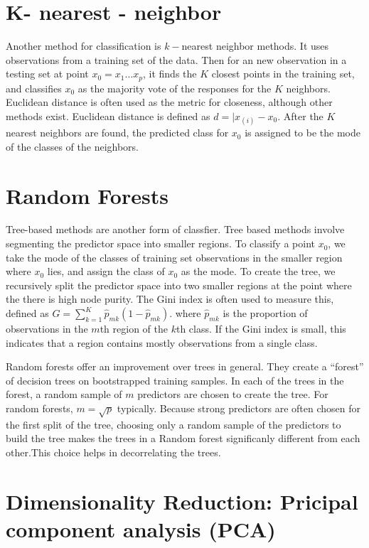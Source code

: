 \documentclass[12pt,twoside]{reedthesis}
\theoremstyle{definition}
\theoremstyle{definition}
\theoremstyle{definition}
\theoremstyle{remark}
\begin{document}
\section{K- nearest - neighbor}\label{k--nearest---neighbor}

Another method for classification is \(k-\)nearest neighbor methods. It
uses observations from a training set of the data. Then for an new
observation in a testing set at point \(x_0 = x_1 \ldots x_p\), it finds
the \(K\) closest points in the training set, and classifies \(x_0\) as
the majority vote of the responses for the \(K\) neighbors. Euclidean
distance is often used as the metric for closeness, although other
methods exist. Euclidean distance is defined as \(d = |x_{(i)} - x_0\).
After the \(K\) nearest neighbors are found, the predicted class for
\(x_0\) is assigned to be the mode of the classes of the neighbors.

\section{Random Forests}\label{random-forests}

Tree-based methods are another form of classfier. Tree based methods
involve segmenting the predictor space into smaller regions. To classify
a point \(x_0\), we take the mode of the classes of training set
observations in the smaller region where \(x_0\) lies, and assign the
class of \(x_0\) as the mode. To create the tree, we recursively split
the predictor space into two smaller regions at the point where the
there is high node purity. The Gini index is often used to measure this,
defined as \(G = \sum_{k = 1}^K \hat{p}_{mk}(1 - \hat{p}_{mk})\). where
\(\hat{p}_{mk}\) is the proportion of observations in the \(m\)th region
of the \(k\)th class. If the Gini index is small, this indicates that a
region contains mostly observations from a single class.

Random forests offer an improvement over trees in general. They create a
``forest'' of decision trees on bootstrapped training samples. In each
of the trees in the forest, a random sample of \(m\) predictors are
chosen to create the tree. For random forests, \(m = \sqrt{p}\)
typically. Because strong predictors are often chosen for the first
split of the tree, choosing only a random sample of the predictors to
build the tree makes the trees in a Random forest significanly different
from each other.This choice helps in decorrelating the trees.

\section{Dimensionality Reduction: Pricipal component analysis
(PCA)}\label{dimensionality-reduction-pricipal-component-analysis-pca}
\end{document}
